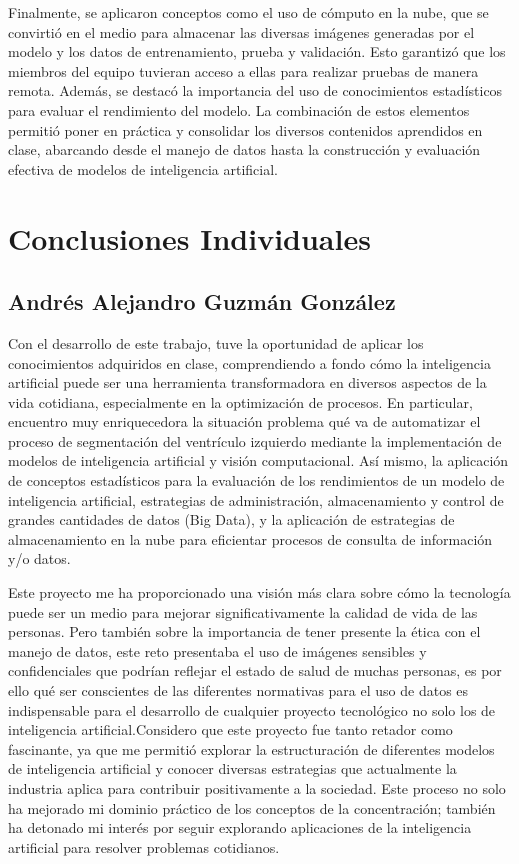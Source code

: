 \documentclass[runningheads]{llncs}
\begin{document}
Finalmente, se aplicaron conceptos como el uso de cómputo en la nube, que se convirtió en el medio para almacenar las diversas imágenes generadas por el modelo y los datos de entrenamiento, prueba y validación. Esto garantizó que los miembros del equipo tuvieran acceso a ellas para realizar pruebas de manera remota. Además, se destacó la importancia del uso de conocimientos estadísticos para evaluar el rendimiento del modelo. La combinación de estos elementos permitió poner en práctica y consolidar los diversos contenidos aprendidos en clase, abarcando desde el manejo de datos hasta la construcción y evaluación efectiva de modelos de inteligencia artificial.

\section{Conclusiones Individuales}

\subsection*{Andrés Alejandro Guzmán González}

Con el desarrollo de este trabajo, tuve la oportunidad de aplicar los conocimientos adquiridos en clase, comprendiendo a fondo cómo la inteligencia artificial puede ser una herramienta transformadora en diversos aspectos de la vida cotidiana, especialmente en la optimización de procesos. En particular, encuentro muy enriquecedora la situación problema qué va de automatizar el proceso de segmentación del ventrículo izquierdo mediante la implementación de modelos de inteligencia artificial y visión computacional. Así mismo, la aplicación de conceptos estadísticos para la evaluación de los rendimientos de un modelo de inteligencia artificial, estrategias de administración, almacenamiento y control de grandes cantidades de datos (Big Data), y la aplicación de estrategias de almacenamiento en la nube para eficientar procesos de consulta de información y/o datos.

Este proyecto me ha proporcionado una visión más clara sobre cómo la tecnología puede ser un medio para mejorar significativamente la calidad de vida de las personas. Pero también sobre la importancia de tener presente la ética con el manejo de datos, este reto presentaba el uso de imágenes sensibles y confidenciales que podrían reflejar el estado de salud de muchas personas, es por ello qué ser conscientes de las diferentes normativas para el uso de datos es indispensable para el desarrollo de cualquier proyecto tecnológico no solo los de inteligencia artificial.Considero que este proyecto fue tanto retador como fascinante, ya que me permitió explorar la estructuración de diferentes modelos de inteligencia artificial y conocer diversas estrategias que actualmente la industria aplica para contribuir positivamente a la sociedad. Este proceso no solo ha mejorado mi dominio práctico de los conceptos de la concentración; también ha detonado mi interés por seguir explorando aplicaciones de la inteligencia artificial para resolver problemas cotidianos.
\end{document}
